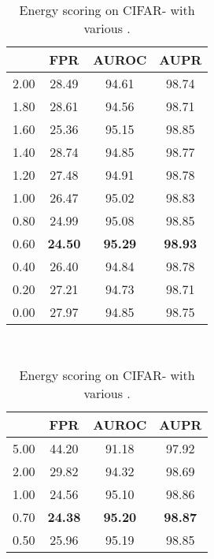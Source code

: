 \documentclass{article}
\begin{document}
\begin{table}[t]
\centering
\parbox{.30\linewidth}{
\centering
\scriptsize
\caption{Energy scoring on CIFAR-  with various .} \label{tab: ablation sigma full cifar10}
\vspace{5pt}
{
\begin{tabular}{c|ccc}
\toprule[1.5pt]
            & FPR     & AUROC       & AUPR      \\
\midrule[0.6pt]
2.00        & 28.49       & 94.61       & 98.74     \\
1.80        & 28.61       & 94.56       & 98.71     \\
1.60        & 25.36       & 95.15       & 98.85     \\
1.40        & 28.74       & 94.85       & 98.77     \\
1.20        & 27.48       & 94.91       & 98.78     \\
1.00        & 26.47       & 95.02       & 98.83     \\
0.80        & 24.99       & 95.08       & 98.85     \\
\cellcolor{greyC}0.60        & \cellcolor{greyC}\textbf{24.50}       & \cellcolor{greyC}\textbf{95.29}       & \cellcolor{greyC}\textbf{98.93}     \\
0.40        & 26.40       & 94.84       & 98.78     \\
0.20        & 27.21       & 94.73       & 98.71     \\
0.00        & 27.97       & 94.85       & 98.75     \\
\bottomrule[1.5pt]      
\end{tabular}
}}~~
\parbox{.30\linewidth}{
\centering
\caption{Energy scoring on CIFAR-  with various .} 
\scriptsize
\vspace{5pt}
{
\begin{tabular}{c|ccc}
\toprule[1.5pt]
             & FPR     & AUROC      & AUPR      \\
\midrule[0.6pt]
5.00               & 44.20                  & 91.18                  & 97.92 \\
2.00               & 29.82                  & 94.32                  & 98.69 \\
1.00               & 24.56                  & 95.10                  & 98.86 \\
\cellcolor{greyC}0.70               &  \cellcolor{greyC}\textbf{24.38}                  &  \cellcolor{greyC}\textbf{95.20}                  &  \cellcolor{greyC}\textbf{98.87} \\
0.50               & 25.96                  & 95.19                  & 98.85 \\

\end{tabular}}}
\end{table}
\end{document}
